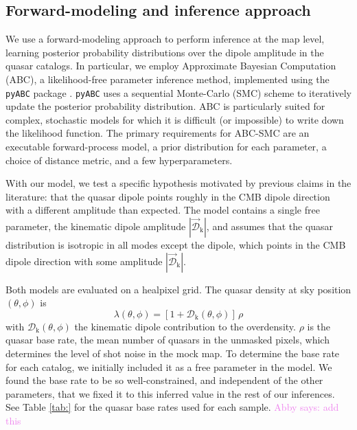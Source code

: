 \documentclass[modern]{aastex631}
\newcommand{\abby}[1]{\textcolor{violet}{Abby says: #1}}
\newcommand{\dipamp}{|\vec{\mathcal{D}}_\mathrm{k}|}
\begin{document}
\subsection{Forward-modeling and inference approach}
\label{sec:FLI}

We use a forward-modeling approach to perform inference at the map level, learning posterior probability distributions over the dipole amplitude in the quasar catalogs.
In particular, we employ Approximate Bayesian Computation (ABC), a likelihood-free parameter inference method, implemented using the \texttt{pyABC} package \citep{schalte_pyabc_2022}.
\texttt{pyABC} uses a sequential Monte-Carlo (SMC) scheme to iteratively update the posterior probability distribution.
ABC is particularly suited for complex, stochastic models for which it is difficult (or impossible) to write down the likelihood function.
The primary requirements for ABC-SMC are an executable forward-process model, a prior distribution for each parameter, a choice of distance metric, and a few hyperparameters.

With our model, we test a specific hypothesis motivated by previous claims in the literature: that the quasar dipole points roughly in the CMB dipole direction with a different amplitude than expected.
The model contains a single free parameter, the kinematic dipole amplitude $\dipamp$, and assumes that the quasar distribution is isotropic in all modes except the dipole, which points in the CMB dipole direction with some amplitude $\dipamp$.

Both models are evaluated on a healpixel grid.
The quasar density at sky position $(\theta,\phi)$ is
\begin{equation}
    \lambda(\theta,\phi) = \left[1 + \mathcal{D}_\mathrm{k}(\theta,\phi)\right]\,\rho
\end{equation}
with $\mathcal{D}_\mathrm{k}(\theta,\phi)$ the kinematic dipole contribution to the overdensity.
$\rho$ is the quasar base rate, the mean number of quasars in the unmasked pixels, which determines the level of shot noise in the mock map.
To determine the base rate for each catalog, we initially included it as a free parameter in the model.
We found the base rate to be so well-constrained, and independent of the other parameters, that we fixed it to this inferred value in the rest of our inferences.
See Table \ref{tab:} for the quasar base rates used for each sample. \abby{add this}
\end{document}
